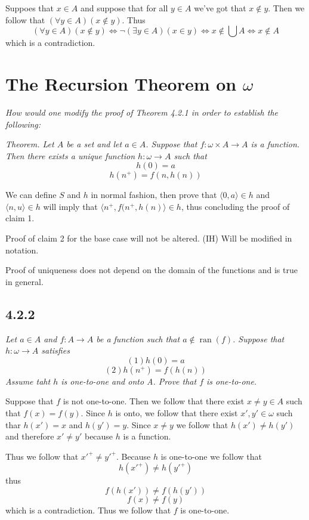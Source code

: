 \documentclass[11pt,oneside,titlepage]{book}
\DeclareMathOperator \lra {\Leftrightarrow}
\DeclareMathOperator \ran {ran}
\newcommand{\eangle}[1]{\langle #1 \rangle}
\begin{document}
Suppoes that $x \in A$ and suppose that for all $y \in A$ we've got that $x \notin y$.
Then we follow that $(\forall y \in A)(x \notin y)$. Thus
$$(\forall y \in A)(x \notin y) \lra \neg (\exists y \in A)(x \in y) \lra x \notin \bigcup A \lra
x \notin A$$
which is a contradiction.

\section{The Recursion Theorem on $\omega$}

\textit{How would one modify the proof of Theorem 4.2.1 in order to establish the
  following: }

\textit{Theorem. Let $A$ be a set and let $a \in A$. Suppose that $f: \omega \times A \to A$
  is a function. Then there exists a unique function $h: \omega \to A$ such that
  $$h(0) = a$$
  $$h(n^+) = f(n, h(n))$$}

We can define $S$ and $h$ in normal fashion, then prove that $\eangle{0, a} \in h$ and
$\eangle{n, u} \in h$ will imply that $\eangle{n^+, f(n^+, h(n)} \in h$, thus concluding the
proof of claim 1.

Proof of claim 2 for the base case will not be altered. (IH) Will be modified in notation.


Proof of uniqueness does not depend on the domain of the functions and is true in general.

\subsection*{4.2.2}

\textit{Let $a \in A$ and $f: A \to A$ be a function such that $a \notin \ran(f)$. Suppose that
  $h: \omega \to A$ satisfies
  $$(1) h(0) = a$$
  $$(2) h(n^+) = f(h(n))$$
  Assume taht $h$ is one-to-one and onto A. Prove that $f$ is one-to-one.
}

Suppose that $f$ is not one-to-one. Then we follow that there exist $x \neq y \in A$
such that $f(x) = f(y)$. Since $h$ is onto, we follow that there exist $x', y' \in \omega$
such thar $h(x') = x$ and $h(y') = y$. Since $x \neq y$ we follow that $h(x') \neq h(y')$
and therefore $x' \neq y'$ because $h$ is a function.

Thus we follow that $x'^+ \neq y'^+$. Because $h$ is one-to-one we follow that
$$h(x'^+) \neq  h(y'^+)$$
thus
$$f(h(x')) \neq  f(h(y'))$$
$$f(x) \neq  f(y)$$
which is a contradiction. Thus we follow that $f$ is one-to-one.
\end{document}

